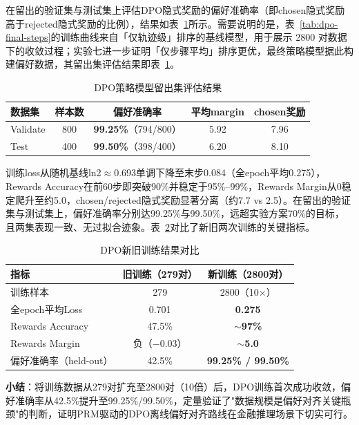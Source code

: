 \documentclass[professional,privacy,print,win,long,STEM,AutoFakeBold]{def/buaa}
\begin{document}
在留出的验证集与测试集上评估DPO隐式奖励的偏好准确率（即chosen隐式奖励高于rejected隐式奖励的比例），结果如表~\ref{tab:dpo-final-eval}所示。需要说明的是，表~\ref{tab:dpo-final-steps}的训练曲线来自「仅轨迹级」排序的基线模型，用于展示 2800 对数据下的收敛过程；实验七进一步证明「仅步骤平均」排序更优，最终策略模型据此构建偏好数据，其留出集评估结果即表~\ref{tab:dpo-final-eval}。

\begin{table}[h]
\centering
\caption{DPO策略模型留出集评估结果}
\label{tab:dpo-final-eval}
\begin{tabular}{lcccc}
\toprule
数据集 & 样本数 & 偏好准确率 & 平均margin & chosen奖励 \\
\midrule
Validate & 800 & \textbf{99.25\%}（794/800） & 5.92 & 7.96 \\
Test & 400 & \textbf{99.50\%}（398/400） & 6.20 & 8.10 \\
\bottomrule
\end{tabular}
\end{table}

训练loss从随机基线ln2$\approx$0.693单调下降至末步0.084（全epoch平均0.275），Rewards Accuracy在前60步即突破90\%并稳定于95\%--99\%，Rewards Margin从0稳定爬升至约5.0，chosen/rejected隐式奖励显著分离（约7.7 vs 2.5）。在留出的验证集与测试集上，偏好准确率分别达99.25\%与99.50\%，远超实验方案70\%的目标，且两集表现一致、无过拟合迹象。表~\ref{tab:dpo-compare}对比了新旧两次训练的关键指标。

\begin{table}[h]
\centering
\caption{DPO新旧训练结果对比}
\label{tab:dpo-compare}
\begin{tabular}{lcc}
\toprule
指标 & 旧训练（279对） & 新训练（2800对） \\
\midrule
训练样本 & 279 & 2800（10$\times$） \\
全epoch平均Loss & 0.701 & \textbf{0.275} \\
Rewards Accuracy & 47.5\% & \textbf{$\sim$97\%} \\
Rewards Margin & 负（$-$0.03） & \textbf{$\sim$5.0} \\
偏好准确率（held-out） & 42.5\% & \textbf{99.25\% / 99.50\%} \\
\bottomrule
\end{tabular}
\end{table}

\textbf{小结}：将训练数据从279对扩充至2800对（10倍）后，DPO训练首次成功收敛，偏好准确率从42.5\%提升至99.25\%/99.50\%，定量验证了"数据规模是偏好对齐关键瓶颈"的判断，证明PRM驱动的DPO离线偏好对齐路线在金融推理场景下切实可行。
\end{document}
